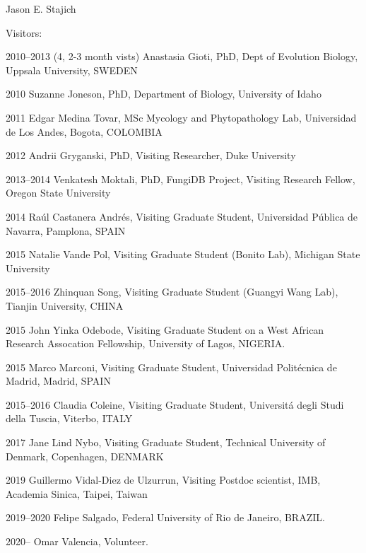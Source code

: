 \documentclass[10pt]{article}
\begin{document}
\begin{cv}{\centerline{Jason E. Stajich}}
\begin{cvlistcompact}{Visitors:}
\item [2010--2013 (4, 2-3 month vists)] Anastasia Gioti, PhD,
  Dept of Evolution Biology, Uppsala University, SWEDEN
\item [2010] Suzanne Joneson, PhD, Department of Biology, University of Idaho
\item [2011] Edgar Medina Tovar, MSc
  Mycology and Phytopathology Lab, Universidad de Los Andes, Bogota, COLOMBIA
\item [2012] Andrii Gryganski, PhD, Visiting Researcher, Duke University
\item [2013--2014] Venkatesh Moktali, PhD,
  FungiDB Project, Visiting Research Fellow, Oregon State University
\item [2014] Ra\'{u}l Castanera Andr\'{e}s, Visiting Graduate Student,
  Universidad P\'{u}blica de Navarra, Pamplona, SPAIN
\item [2015] Natalie Vande Pol, Visiting Graduate Student (Bonito Lab), Michigan State University
\item [2015--2016] Zhinquan Song, Visiting Graduate Student (Guangyi
  Wang Lab), Tianjin University, CHINA
\item [2015] John Yinka Odebode, Visiting Graduate Student on a West
  African Research Assocation Fellowship, University of Lagos, NIGERIA.
\item [2015] Marco Marconi, Visiting Graduate Student,
    Universidad Polit\'{e}cnica de Madrid, Madrid, SPAIN
\item [2015--2016] Claudia Coleine, Visiting Graduate Student,
    Universit\'{a} degli Studi della Tuscia, Viterbo, ITALY
\item [2017] Jane Lind Nybo, Visiting Graduate Student,
Technical University of Denmark, Copenhagen, DENMARK
\item [2019] Guillermo Vidal-Diez de Ulzurrun, Visiting Postdoc scientist,
IMB, Academia Sinica, Taipei, Taiwan
\item [2019--2020] Felipe Salgado, Federal University of Rio de Janeiro, BRAZIL.
\item [2020--] Omar Valencia, Volunteer.
\end{cvlistcompact}


\end{cv}
\end{document}
